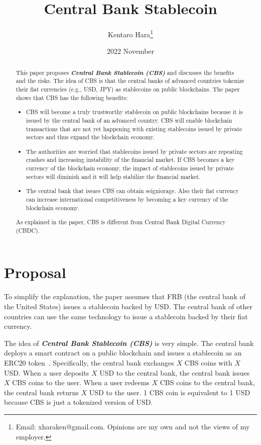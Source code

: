 \documentclass[dvipdfmx,a4paper]{article}
\title{\textbf{Central Bank Stablecoin}}
\author{Kentaro Hara\footnote{Email: xharaken@gmail.com. Opinions are my own and not the views of my employer.}}
\date{2022 November}
\begin{document}
\maketitle

\begin{abstract}

This paper proposes \textbf{\textit{Central Bank Stablecoin (CBS)}} and discusses the benefits and the risks. The idea of CBS is that the central banks of advanced countries tokenize their fiat currencies (e.g., USD, JPY) as stablecoins on public blockchains. The paper shows that CBS has the following benefits:

\begin{itemize}
\item CBS will become a truly trustworthy stablecoin on public blockchains because it is issued by the central bank of an advanced country. CBS will enable blockchain transactions that are not yet happening with existing stablecoins issued by private sectors and thus expand the blockchain economy.
\item The authorities are worried that stablecoins issued by private sectors are repeating crashes and increasing instability of the financial market. If CBS becomes a key currency of the blockchain economy, the impact of stablecoins issued by private sectors will diminish and it will help stabilize the financial market.
\item The central bank that issues CBS can obtain seigniorage. Also their fiat currency can increase international competitiveness by becoming a key currency of the blockchain economy.
\end{itemize}

As explained in the paper, CBS is different from Central Bank Digital Currency (CBDC).

\end{abstract}

\section{Proposal}

To simplify the explanation, the paper assumes that FRB (the central bank of the United States) issues a stablecoin backed by USD. The central bank of other countries can use the same technology to issue a stablecoin backed by their fiat currency.

The idea of \textbf{\textit{Central Bank Stablecoin (CBS)}} is very simple. The central bank deploys a smart contract on a public blockchain and issues a stablecoin as an ERC20 token~\cite{erc20token}. Specifically, the central bank exchanges $X$ CBS coins with $X$ USD. When a user deposits $X$ USD to the central bank, the central bank issues $X$ CBS coins to the user. When a user redeems $X$ CBS coins to the central bank, the central bank returns $X$ USD to the user. 1 CBS coin is equivalent to 1 USD because CBS is just a tokenized version of USD.
\end{document}
